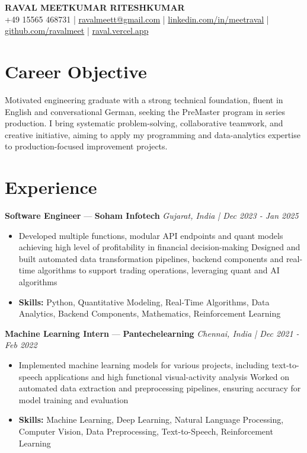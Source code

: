 \documentclass[a4paper,10pt]{article}
\begin{document}
\begin{center}
  {\Large\bfseries RAVAL MEETKUMAR RITESHKUMAR}\\[2pt]
  {\small +49 15565 468731 \;|\; \href{mailto:ravalmeett@gmail.com}{ravalmeett@gmail.com} \;|\; \href{https://www.linkedin.com/in/meetraval/}{linkedin.com/in/meetraval} \;|\; \href{https://github.com/ravalmeet}{github.com/ravalmeet} \;|\; \href{https://raval.vercel.app/}{raval.vercel.app}}
\end{center}
\vspace{-3pt}

\section*{Career Objective}
Motivated engineering graduate with a strong technical foundation, fluent in English and conversational German, seeking the PreMaster program in series production. I bring systematic problem-solving, collaborative teamwork, and creative initiative, aiming to apply my programming and data-analytics expertise to production-focused improvement projects.\par

\section*{Experience}
\textbf{Software Engineer} — \textbf{Soham Infotech} \hfill \textit{Gujarat, India \;|\; Dec 2023 - Jan 2025}\par
\vspace{1pt}
\begin{itemize}
  \item Developed multiple functions, modular API endpoints and quant models achieving high level of profitability in financial decision-making Designed and built automated data transformation pipelines, backend components and real-time algorithms to support trading operations, leveraging quant and AI algorithms
  \item \textbf{Skills:} Python, Quantitative Modeling, Real-Time Algorithms, Data Analytics, Backend Components, Mathematics, Reinforcement Learning
\end{itemize}
\vspace{3pt}
\textbf{Machine Learning Intern} — \textbf{Pantechelearning} \hfill \textit{Chennai, India \;|\; Dec 2021 - Feb 2022}\par
\vspace{1pt}
\begin{itemize}
  \item Implemented machine learning models for various projects, including text-to-speech applications and high functional visual-activity analysis Worked on automated data extraction and preprocessing pipelines, ensuring accuracy for model training and evaluation
  \item \textbf{Skills:} Machine Learning, Deep Learning, Natural Language Processing, Computer Vision, Data Preprocessing, Text-to-Speech, Reinforcement Learning
\end{itemize}
\end{document}
